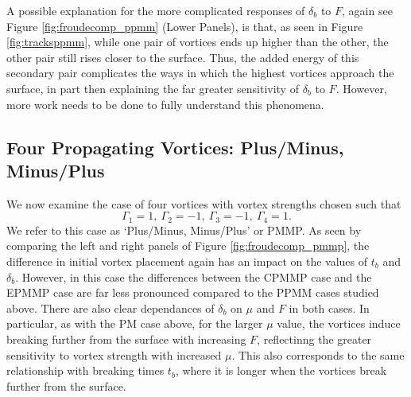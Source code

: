 \documentclass[a4paper,11pt]{article}
\begin{document}
A possible explanation for the more complicated responses of $\delta_{b}$ to $F$, again see Figure \ref{fig:froudecomp_ppmm} (Lower Panels), is that, as seen in Figure \ref{fig:tracksppmm}, while one pair of vortices ends up higher than the other, the other pair still rises closer to the surface.  Thus, the added energy of this secondary pair complicates the ways in which the highest vortices approach the surface, in part then explaining the far greater sensitivity of $\delta_{b}$ to $F$.  However, more work needs to be done to fully understand this phenomena.  

\subsection{Four Propagating Vortices: Plus/Minus, Minus/Plus}
We now examine the case of four vortices with vortex strengths chosen such that
\[
\Gamma_{1}=1, ~ \Gamma_{2}=-1, ~ \Gamma_{3}=-1,~\Gamma_{4}=1.
\]
We refer to this case as `Plus/Minus, Minus/Plus' or PMMP.  As seen by comparing the left and right panels of Figure \ref{fig:froudecomp_pmmp}, the difference in initial vortex placement again has an impact on the values of $t_{b}$ and $\delta_{b}$.  However, in this case the differences between the CPMMP case and the EPMMP case are far less pronounced compared to the PPMM cases studied above.  There are also clear dependances of $\delta_{b}$ on $\mu$ and $F$ in both cases.  In particular, as with the PM case above, for the larger $\mu$ value, the vortices induce breaking further from the surface with increasing $F$, reflectinng the greater sensitivity to vortex strength with increased $\mu$.  This also corresponds to the same relationship with breaking times $t_{b}$, where it is longer when the vortices break further from the surface.  
\end{document}
